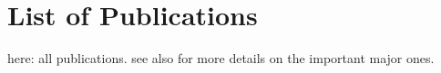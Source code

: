 
\cleardoublepage

\chapter{List of Publications}
\label{ch:Publications}

here: all publications.
see also  for more details on the important major ones.



